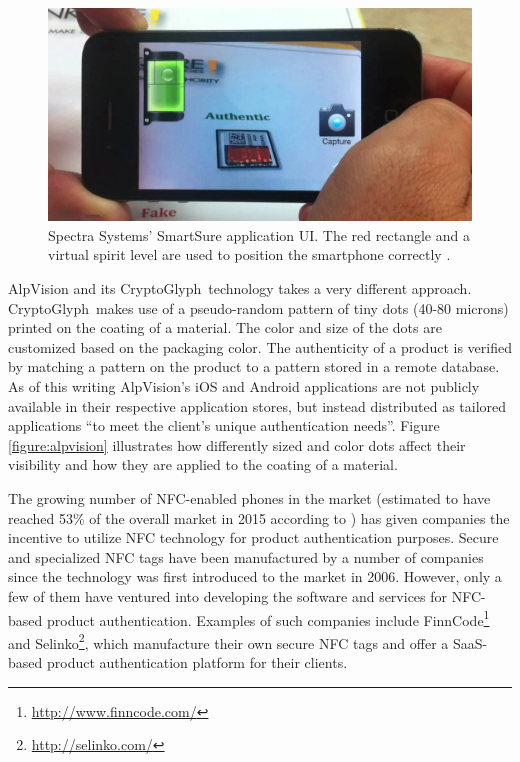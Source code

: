 \documentclass[thesis.tex]{subfiles}
\begin{document}
\begin{figure}[ht]
\centering \includegraphics[width=13.25cm]{images/existing_solutions/smartsure}
\caption{Spectra Systems' SmartSure application UI. The red rectangle and a virtual spirit level are used to position the smartphone correctly \cite{inksure}. \label{figure:inksure}}
\end{figure}

AlpVision and its CryptoGlyph\textregistered\ technology takes a very different approach. CryptoGlyph\textregistered\ makes use of a pseudo-random pattern of tiny dots (40-80 microns) printed on the coating of a material. The color and size of the dots are customized based on the packaging color. The authenticity of a product is verified by matching a pattern on the product to a pattern stored in a remote database. As of this writing AlpVision's iOS and Android applications are not publicly available in their respective application stores, but instead distributed as tailored applications ``to meet the client's unique authentication needs''. Figure \ref{figure:alpvision} illustrates how differently sized and color dots affect their visibility and how they are applied to the coating of a material. \cite{alpvision}

The growing number of NFC-enabled phones in the market (estimated to have reached 53\% of the overall market in 2015 according to \cite{frost-sullivan}) has given companies the incentive to utilize NFC technology for product authentication purposes. Secure and specialized NFC tags have been manufactured by a number of companies since the technology was first introduced to the market in 2006. However, only a few of them have ventured into developing the software and services for NFC-based product authentication. Examples of such companies include FinnCode\footnote{\url{http://www.finncode.com/}} and Selinko\footnote{\url{http://selinko.com/}}, which manufacture their own secure NFC tags and offer a SaaS-based product authentication platform for their clients.
\end{document}
